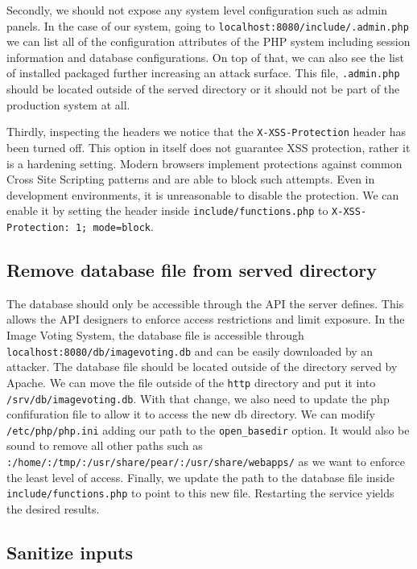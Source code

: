 \documentclass[a4paper, 12pt]{article}
\begin{document}
Secondly, we should not expose any system level configuration such as admin panels. In the case of our system, going to \texttt{localhost:8080/include/.admin.php} we can list all of the configuration attributes of the PHP system including session information and database configurations. On top of that, we can also see the list of installed packaged further increasing an attack surface. This file, \texttt{.admin.php} should be located outside of the served directory or it should not be part of the production system at all.

Thirdly, inspecting the headers we notice that the \texttt{X-XSS-Protection} header has been turned off. This option in itself does not guarantee XSS protection, rather it is a hardening setting. Modern browsers implement protections against common Cross Site Scripting patterns and are able to block such attempts. Even in development environments, it is unreasonable to disable the protection. We can enable it by setting the header inside \texttt{include/functions.php} to \texttt{X-XSS-Protection: 1; mode=block}.

\subsection*{Remove database file from served directory}
The database should only be accessible through the API the server defines. This allows the API designers to enforce access restrictions and limit exposure. In the Image Voting System, the database file is accessible through \texttt{localhost:8080/db/imagevoting.db} and can be easily downloaded by an attacker. The database file should be located outside of the directory served by Apache. We can move the file outside of the \texttt{http} directory and put it into \texttt{/srv/db/imagevoting.db}. With that change, we also need to update the php confifuration file to allow it to access the new db directory. We can modify \texttt{/etc/php/php.ini} adding our path to the \texttt{open\_basedir} option. It would also be sound to remove all other paths such as \texttt{:/home/:/tmp/:/usr/share/pear/:/usr/share/webapps/} as we want to enforce the least level of access. Finally, we update the path to the database file inside \texttt{include/functions.php} to point to this new file. Restarting the service yields the desired results.

\subsection*{Sanitize inputs}





\newpage


\end{document}
